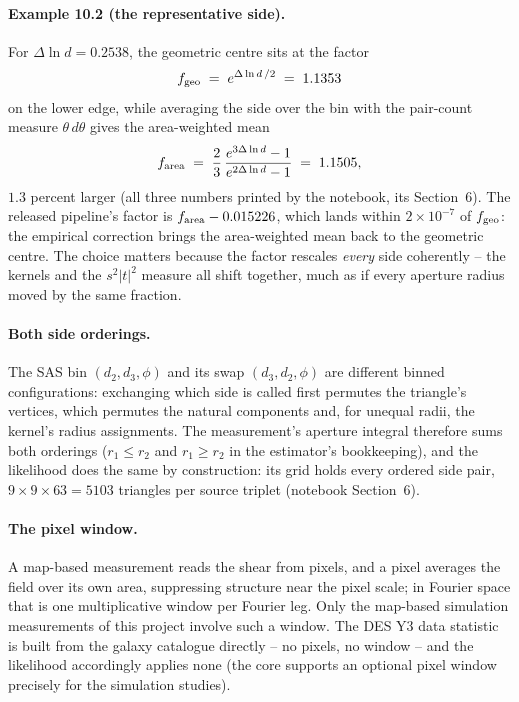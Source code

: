 \documentclass[11pt]{article}
\numberwithin{equation}{section}
\begin{document}
\paragraph{Example 10.2 (the representative side).}
For $\Delta\ln d = 0.2538$, the geometric centre sits at the
factor
\begin{equation}
  f_{\rm geo} \;=\; e^{\Delta\ln d\,/2} \;=\; 1.1353
  \label{eq:fgeo}
\end{equation}
on the lower edge, while averaging the side over the bin with the
pair-count measure $\theta\,d\theta$ gives the area-weighted mean
\begin{equation}
  f_{\rm area}
  \;=\; \frac{2}{3}\,
  \frac{e^{3\Delta\ln d} - 1}{e^{2\Delta\ln d} - 1}
  \;=\; 1.1505 ,
  \label{eq:farea}
\end{equation}
$1.3$ percent larger (all three numbers printed by the notebook,
its Section~6).  The released pipeline's factor is
$f_{\rm area} - 0.015226$, which lands within $2\times 10^{-7}$
of $f_{\rm geo}$: the empirical correction brings the
area-weighted mean back to the geometric centre.  The choice
matters because the factor rescales \emph{every} side coherently
-- the kernels and the $s^2|t|^2$ measure all shift together, much
as if every aperture radius moved by the same fraction.

\paragraph{Both side orderings.}
The SAS bin $(d_2, d_3, \phi)$ and its swap $(d_3, d_2, \phi)$
are different binned configurations: exchanging which side is
called first permutes the triangle's vertices, which permutes the
natural components and, for unequal radii, the kernel's radius
assignments.  The measurement's aperture integral therefore sums
both orderings ($r_1 \le r_2$ and $r_1 \ge r_2$ in the
estimator's bookkeeping), and the likelihood does the same by
construction: its grid holds every ordered side pair,
$9 \times 9 \times 63 = 5103$ triangles per source triplet
(notebook Section~6).

\paragraph{The pixel window.}
A map-based measurement reads the shear from pixels, and a pixel
averages the field over its own area, suppressing structure near
the pixel scale; in Fourier space that is one multiplicative window
per Fourier leg.  Only the map-based simulation measurements of
this project involve such a window.  The DES Y3 data statistic is
built from the galaxy catalogue directly -- no pixels, no window --
and the likelihood accordingly applies none (the core supports an
optional pixel window precisely for the simulation studies).
\end{document}
